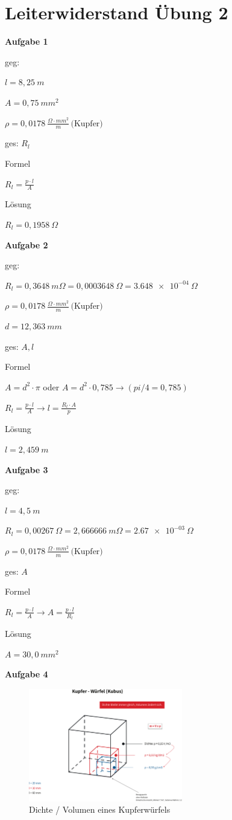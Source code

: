 \section{Leiterwiderstand Übung 2}\label{leiterwiderstand-uebung-2}

\textbf{Aufgabe 1}

geg:

$l = 8,25~m$

$A = 0,75~mm^2$

$\rho = 0,0178~\frac{\Omega \cdot mm^2}{m} \,\text{(Kupfer)}$

ges: $R_l$

Formel

$R_l = \frac{p \cdot l}{A}$

Lösung

$R_l = 0,1958~\Omega$

\textbf{Aufgabe 2}

geg:

$R_l = 0,3648~m\Omega = 0,0003648~\Omega = \num{3,648e-04}~\Omega$

$\rho = 0,0178~\frac{\Omega \cdot mm^2}{m} \,\text{(Kupfer)}$

$d = 12,363~mm$

ges: $A, l$

Formel

$A = d^2 \cdot \pi$ oder $A = d^2 \cdot 0,785 \to (pi/4 = 0,785)$

$R_l = \frac{p \cdot l}{A} \to l = \frac{R_l \cdot A}{p}$

Lösung

$l = 2,459~m$

\textbf{Aufgabe 3}

geg:

$l = 4,5~m$

$R_l = 0,00267~\Omega = 2,666666~m\Omega = \num{2,67e-03}~\Omega$

$\rho = 0,0178~\frac{\Omega \cdot mm^2}{m} \,\text{(Kupfer)}$

ges: $A$

Formel

$R_l = \frac{p \cdot l}{A} \to A = \frac{p \cdot l}{R_l}$

Lösung

$A = 30,0~mm^2$

\textbf{Aufgabe 4}

\begin{figure}[!ht]%
\centering
\includegraphics[width=0.6\textwidth]{images/Skizze/Kupfer_Wuerfel_Dichte.pdf}
\caption{Dichte / Volumen eines Kupferwürfels}
\end{figure}

